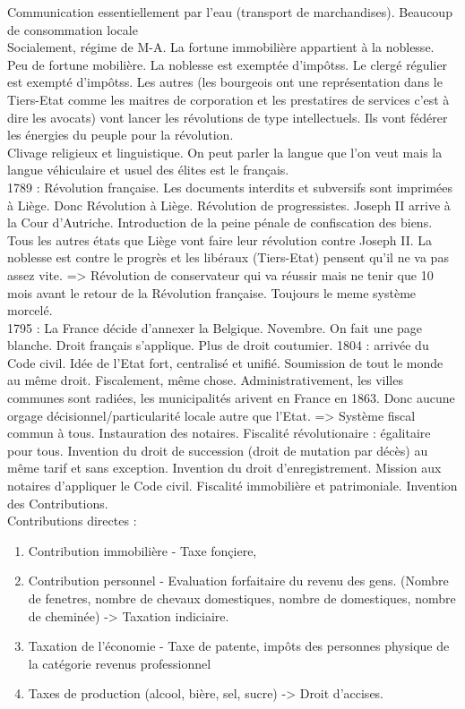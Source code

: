 \documentclass{book}
\begin{document}
Communication essentiellement par l'eau (transport de marchandises). Beaucoup de consommation locale\\

Socialement, régime de M-A. La fortune immobilière appartient à la noblesse. Peu de fortune mobilière. La noblesse est exemptée d'impôtss. Le clergé régulier est exempté d'impôtss. Les autres (les bourgeois ont une représentation dans le Tiers-Etat comme les maitres de corporation et les prestatires de services c'est à dire les avocats) vont lancer les révolutions de type intellectuels. Ils vont fédérer les énergies du peuple pour la révolution.\\

Clivage religieux et linguistique. On peut parler la langue que l'on veut mais la langue véhiculaire et usuel des élites est le français.\\

1789 : Révolution française. Les documents interdits et subversifs sont imprimées à Liège. Donc Révolution à Liège. Révolution de progressistes. Joseph II arrive à la Cour d'Autriche. Introduction de la peine pénale de confiscation des biens. Tous les autres états que Liège vont faire leur révolution contre Joseph II. La noblesse est contre le progrès et les libéraux (Tiers-Etat) pensent qu'il ne va pas assez vite. => Révolution de conservateur qui va réussir mais ne tenir que 10 mois avant le retour de la Révolution française. Toujours le meme système morcelé.\\

1795 : La France décide d'annexer la Belgique. Novembre. On fait une page blanche. Droit français s'applique. Plus de droit coutumier. 1804 : arrivée du Code civil. Idée de l'Etat fort, centralisé et unifié. Soumission de tout le monde au même droit. Fiscalement, même chose. Administrativement, les villes communes sont radiées, les municipalités arivent en France en 1863. Donc aucune orgage décisionnel/particularité locale autre que l'Etat. => Système fiscal commun à tous. Instauration des notaires. Fiscalité révolutionaire : égalitaire pour tous. Invention du droit de succession (droit de mutation par décès) au même tarif et sans exception. Invention du droit d'enregistrement. Mission aux notaires d'appliquer le Code civil. Fiscalité immobilière et patrimoniale. Invention des Contributions.\\

Contributions directes :

\begin{enumerate}
\item Contribution immobilière - Taxe fonçiere, 
\item Contribution personnel - Evaluation forfaitaire du revenu des gens. (Nombre de fenetres, nombre de chevaux domestiques, nombre de domestiques, nombre de cheminée) -> Taxation indiciaire.
\item Taxation de l'économie - Taxe de patente, impôts des personnes physique de la catégorie revenus professionnel
\item Taxes de production (alcool, bière, sel, sucre) -> Droit d'accises.
\end{enumerate}
\end{document}
